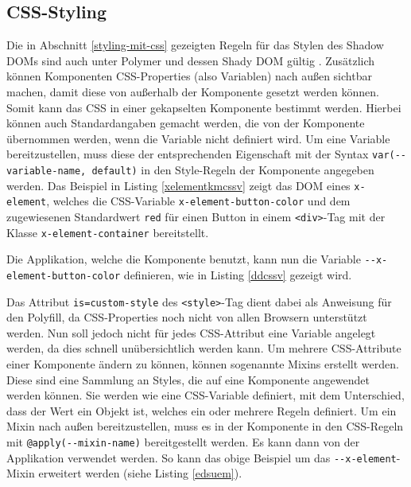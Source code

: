 


\subsection{CSS-Styling}\label{css-styling}

Die in Abschnitt \ref{styling-mit-css} gezeigten Regeln für das Stylen des Shadow \ac{DOM}s sind auch unter Polymer und dessen Shady \ac{DOM} gültig \cite{citeulike:13915080}. Zusätzlich können Komponenten \ac{CSS}-Properties (also Variablen) nach außen sichtbar machen, damit diese von außerhalb der Komponente gesetzt werden können. Somit kann das \ac{CSS} in einer gekapselten Komponente bestimmt werden. Hierbei können auch Standardangaben gemacht werden, die von der Komponente übernommen werden, wenn die Variable nicht definiert wird. Um eine Variable bereitzustellen, muss diese der entsprechenden Eigenschaft mit der Syntax \texttt{var(-\/-variable-name,\ default)} in den Style-Regeln der Komponente angegeben werden. Das Beispiel in Listing \ref{xelementkmcssv} zeigt das \ac{DOM} eines \texttt{x-element}, welches die \ac{CSS}-Variable \texttt{x-element-button-color} und dem zugewiesenen Standardwert \texttt{red} für einen Button in einem \texttt{\textless{}div\textgreater{}}-Tag mit der Klasse \texttt{x-element-container} bereitstellt.



Die Applikation, welche die Komponente benutzt, kann nun die Variable \texttt{-\/-x-element-button-color} definieren, wie in Listing \ref{ddcssv} gezeigt wird.



Das Attribut \texttt{is=\dq custom-style\dq} des \texttt{\textless{}style\textgreater{}}-Tag dient dabei als Anweisung für den Polyfill, da \ac{CSS}-Properties noch nicht von allen Browsern unterstützt werden. Nun soll jedoch nicht für jedes \ac{CSS}-Attribut eine Variable angelegt werden, da dies schnell unübersichtlich werden kann. Um mehrere \ac{CSS}-Attribute einer Komponente ändern zu können, können sogenannte Mixins erstellt werden. Diese sind eine Sammlung an Styles, die auf eine Komponente angewendet werden können. Sie werden wie eine \ac{CSS}-Variable definiert, mit dem Unterschied, dass der Wert ein Objekt ist, welches ein oder mehrere Regeln definiert. Um ein Mixin nach außen bereitzustellen, muss es in der Komponente in den \ac{CSS}-Regeln mit \texttt{@apply(-\/-mixin-name)} bereitgestellt werden. Es kann dann von der Applikation verwendet werden. So kann das obige Beispiel um das \texttt{-\/-x-element}-Mixin erweitert werden (siehe Listing \ref{edsuem}).

